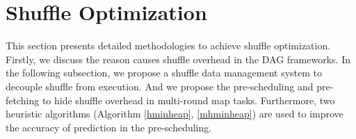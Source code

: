 \section{Shuffle Optimization}
\label{opt}
This section presents detailed methodologies to achieve shuffle optimization. 
{\color{black}
Firstly, we discuss the reason causes shuffle overhead in the DAG frameworks.
In the following subsection, we propose a shuffle data management system to decouple shuffle from execution. 
And we propose the pre-scheduling and pre-fetching to hide shuffle overhead in multi-round map tasks.
Furthermore, two heuristic algorithms (Algorithm \ref{hminheap}, \ref{mhminheap}) are used to improve the accuracy of prediction in the pre-scheduling.
}



